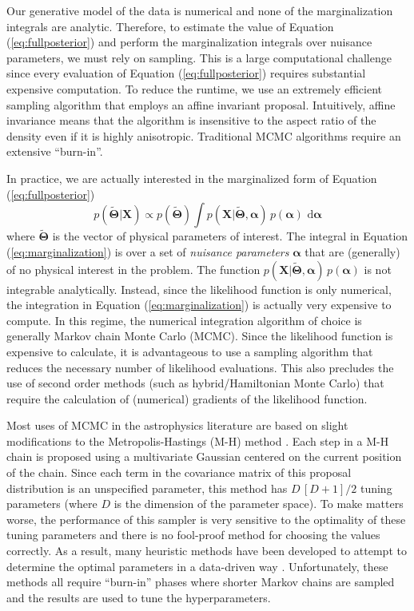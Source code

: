 \documentclass[preprint,12pt]{aastex}
\newcommand{\eqlabel}[1]{\label{eq:#1}}
\newcommand{\eq}[1]{Equation (\ref{eq:#1})}
\newcommand{\dd}{\,\mathrm{d}}
\begin{document}
Our generative model of the data is numerical and none of the marginalization
integrals are analytic. Therefore, to estimate the value of \eq{fullposterior}
and perform the marginalization integrals over nuisance parameters, we must
rely on sampling. This is a large computational challenge since every evaluation
of \eq{fullposterior} requires substantial expensive computation. To reduce the
runtime, we use an extremely efficient sampling algorithm that employs an affine
invariant proposal. Intuitively, affine invariance means that the algorithm is
insensitive to the aspect ratio of the density even if it is highly anisotropic.
Traditional MCMC algorithms require an extensive ``burn-in''.

In practice, we are actually interested in the marginalized form of \eq{fullposterior}
\begin{equation}
    \eqlabel{marginalization}
    p (\tilde{\boldsymbol{\Theta}} | \mathbf{X}) \propto
        p (\tilde{\boldsymbol{\Theta}}) \int
        p (\mathbf{X} | \tilde{\boldsymbol{\Theta}},\boldsymbol{\alpha}) \,
        p (\boldsymbol{\alpha}) \, \dd \boldsymbol{\alpha}
\end{equation}
where $\tilde{\boldsymbol{\Theta}}$ is the vector of physical parameters of
interest. The integral in
\eq{marginalization} is over a set of \emph{nuisance parameters} $\boldsymbol{\alpha}$
that are (generally) of no physical interest in the problem. The function
$p (\mathbf{X} | \tilde{\boldsymbol{\Theta}},\boldsymbol{\alpha}) \, p (\boldsymbol{\alpha})$
is not integrable analytically. Instead, since the likelihood function is only
numerical, the integration in \eq{marginalization} is actually very expensive
to compute. In this regime, the numerical integration algorithm of choice is
generally Markov chain Monte Carlo (MCMC).
Since the likelihood function is expensive to calculate, it is advantageous to
use a sampling algorithm that reduces the necessary number of likelihood
evaluations. This also precludes the use of second order methods (such as
hybrid/Hamiltonian Monte Carlo) that require the calculation of (numerical)
gradients of the likelihood function.

Most uses of MCMC in the astrophysics literature are based on slight modifications
to the Metropolis-Hastings (M-H) method \citep[e.g.][]{MacKay:2003}. Each step in
a M-H chain is proposed using a multivariate Gaussian centered on the current
position of the chain. Since each term in the covariance matrix of this proposal
distribution is an unspecified parameter, this method has $D\,[D+1]/2$ tuning parameters
(where $D$ is the dimension of the parameter space).  To make matters worse, the
performance of this sampler is very sensitive to the optimality of these tuning
parameters and there is no fool-proof method for choosing the values correctly.
As a result, many heuristic methods have been developed to attempt to determine
the optimal parameters in a data-driven way \citep[e.g.][]{Gregory:2005,Dunkley:2005,Widrow:2008}.
Unfortunately, these methods all require ``burn-in'' phases where shorter Markov chains
are sampled and the results are used to tune the hyperparameters.
\end{document}
